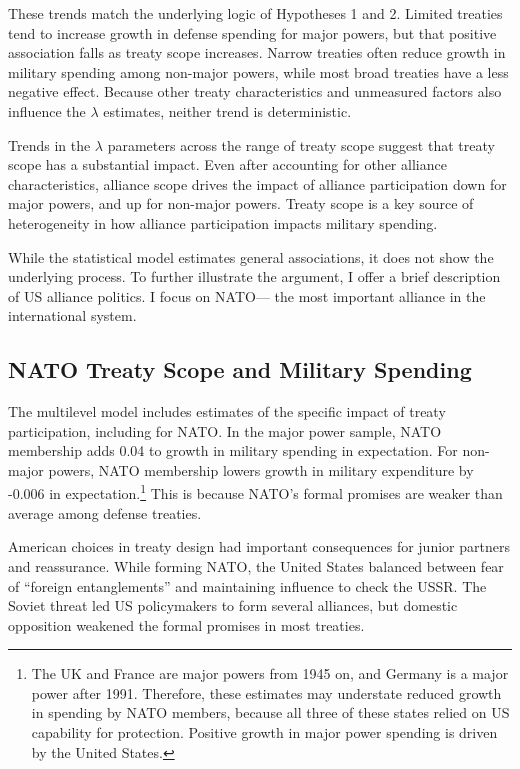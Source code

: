 \documentclass[12pt]{article}
\begin{document}
These trends match the underlying logic of Hypotheses 1 and 2. 
Limited treaties tend to increase growth in defense spending for major powers, but that positive association falls as treaty scope increases. 
Narrow treaties often reduce growth in military spending among non-major powers, while most broad treaties have a less negative effect. 
Because other treaty characteristics and unmeasured factors also influence the $\lambda$ estimates, neither trend is deterministic. 


Trends in the $\lambda$ parameters across the range of treaty scope suggest that treaty scope has a substantial impact. 
Even after accounting for other alliance characteristics, alliance scope drives the impact of alliance participation down for major powers, and up for non-major powers. 
Treaty scope is a key source of heterogeneity in how alliance participation impacts military spending. 


While the statistical model estimates general associations, it does not show the underlying process. 
To further illustrate the argument, I offer a brief description of US alliance politics.   
I focus on NATO--- the most important alliance in the international system.  


\subsection{NATO Treaty Scope and Military Spending}


The multilevel model includes estimates of the specific impact of treaty participation, including for NATO. 
In the major power sample, NATO membership adds 0.04 to growth in military spending in expectation.
For non-major powers, NATO membership lowers growth in military expenditure by -0.006 in expectation.\footnote{
The UK and France are major powers from 1945 on, and Germany is a major power after 1991. Therefore, these estimates may understate reduced growth in spending by NATO members, because all three of these states relied on US capability for protection. Positive growth in major power spending is driven by the United States.}
This is because NATO's formal promises are weaker than average among defense treaties. 


American choices in treaty design had important consequences for junior partners and reassurance. 
While forming NATO, the United States balanced between fear of ``foreign entanglements'' and maintaining influence to check the USSR.
The Soviet threat led US policymakers to form several alliances, but domestic opposition weakened the formal promises in most treaties. 
\end{document}
